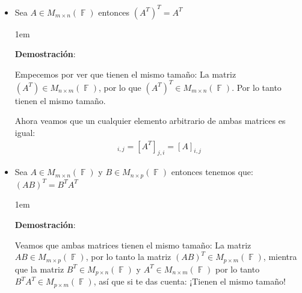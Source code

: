 \documentclass[12pt, fleqn]{report}                             %
\newenvironment{SmallIndentation}[1][0.75em]                    %
        {\begin{adjustwidth}{#1}{}\begin{footnotesize}}             %
        {\end{footnotesize}\end{adjustwidth}}                       %
\theoremstyle{break}                                            %
\DeclareMathOperator \GenericField {\mathbb{F}}                 %
\begin{document}
                \begin{itemize}

                    \item Sea $A\in M_{m \times n}(\GenericField)$ entonces $(A^T)^T = A^T$
                        \begin{SmallIndentation}[1em]
                            \textbf{Demostración}:

                            Empecemos por ver que tienen el mismo tamaño:
                            La matriz $(A^T) \in M_{n \times m}(\GenericField)$, por lo que 
                            $(A^T)^T \in M_{m \times n}(\GenericField)$.
                            Por lo tanto tienen el mismo tamaño.

                            Ahora veamos que un cualquier elemento arbitrario de ambas matrices es igual:
                            \begin{align*}
                                [(A^T)^T]_{i, j}    
                                    = [A^T]_{j, i}               
                                    = [A]_{i, j}
                            \end{align*}

                        \end{SmallIndentation}

                    \item Sea $A \in M_{m \times n}(\GenericField)$ y $B \in M_{n \times p}(\GenericField)$
                        entonces tenemos que: $(AB)^T = B^T A^T$

                        \begin{SmallIndentation}[1em]
                            \textbf{Demostración}:

                            Veamos que ambas matrices tienen el mismo tamaño: 
                            La matriz $AB \in M_{m \times p}(\GenericField)$, por lo tanto la matriz
                            $(AB)^T \in M_{p \times m}(\GenericField)$, mientra que la matriz 
                            $B^T \in M_{p \times n}(\GenericField)$ y $A^T \in M_{n \times m}(\GenericField)$
                            por lo tanto $B^T A^T \in M_{p \times m}(\GenericField)$, así que si te das
                            cuenta: ¡Tienen el mismo tamaño!


\end{SmallIndentation}
\end{itemize}
\end{document}
